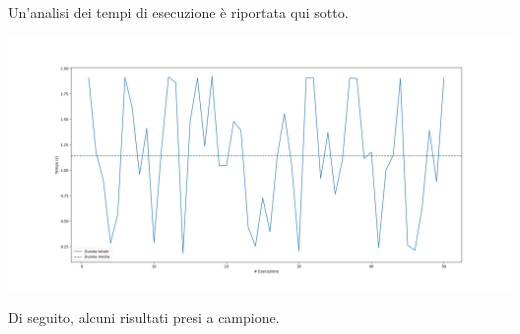 \documentclass{CSUniSchoolLabReport}
\begin{document}
Un'analisi dei tempi di esecuzione è riportata qui sotto. 

\begin{center}
	\includegraphics[scale=0.25]{results/esecuzioni}
\end{center}

Di seguito, alcuni risultati presi a campione.

\pagebreak{}
\end{document}
